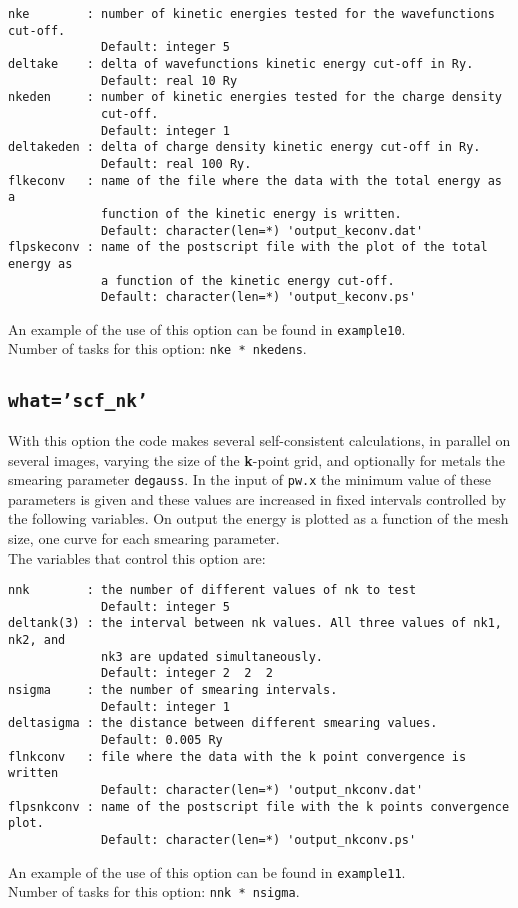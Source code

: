 \documentclass[12pt,a4paper]{article}
\begin{document}
\begin{verbatim}
nke        : number of kinetic energies tested for the wavefunctions cut-off.
             Default: integer 5
deltake    : delta of wavefunctions kinetic energy cut-off in Ry.
             Default: real 10 Ry
nkeden     : number of kinetic energies tested for the charge density
             cut-off.
             Default: integer 1
deltakeden : delta of charge density kinetic energy cut-off in Ry.
             Default: real 100 Ry.
flkeconv   : name of the file where the data with the total energy as a
             function of the kinetic energy is written.
             Default: character(len=*) 'output_keconv.dat'
flpskeconv : name of the postscript file with the plot of the total energy as
             a function of the kinetic energy cut-off.
             Default: character(len=*) 'output_keconv.ps'
\end{verbatim}
An example of the use of this option can be found in \texttt{example10}. \\
Number of tasks for this option: \texttt{nke * nkedens}.

\subsection{\color{web-blue}\texttt{what='scf\_nk'}}
With this option the code makes several self-consistent calculations, 
in parallel on several images, varying the size of the {\bf k}-point grid, 
and optionally for metals the smearing parameter \texttt{degauss}. In the 
input of \texttt{pw.x} the minimum value of these parameters is given and 
these values are increased in fixed intervals controlled by the following 
variables. On output the energy is plotted as a function of the mesh size, 
one curve for each smearing parameter.\\
The variables that control this option are:

\begin{verbatim}
nnk        : the number of different values of nk to test
             Default: integer 5
deltank(3) : the interval between nk values. All three values of nk1, nk2, and
             nk3 are updated simultaneously.
             Default: integer 2  2  2
nsigma     : the number of smearing intervals.
             Default: integer 1 
deltasigma : the distance between different smearing values.
             Default: 0.005 Ry
flnkconv   : file where the data with the k point convergence is written
             Default: character(len=*) 'output_nkconv.dat'
flpsnkconv : name of the postscript file with the k points convergence plot.
             Default: character(len=*) 'output_nkconv.ps'
\end{verbatim}
An example of the use of this option can be found in \texttt{example11}. \\
Number of tasks for this option: \texttt{nnk * nsigma}.
\end{document}

